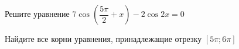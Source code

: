 \begin{ex}
	\begin{condition}
		\begin{enumcols}[label=\asbuk*)]
			\item Решите уравнение \( 7\cos{\left(\dfrac{5\pi}{2}+x\right)} - 2\cos 2x  = 0 \)
			\item Найдите все корни уравнения, принадлежащие отрезку \( \left[5\pi;6\pi\right] \)
		\end{enumcols}
	\end{condition}
\end{ex}